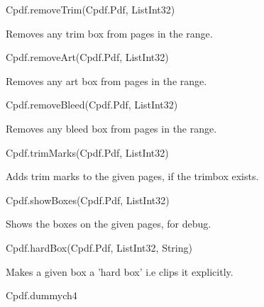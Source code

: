 Cpdf.removeTrim(Cpdf.Pdf, List{Int32})

Removes any trim box from pages in the range.

Cpdf.removeArt(Cpdf.Pdf, List{Int32})

Removes any art box from pages in the range.

Cpdf.removeBleed(Cpdf.Pdf, List{Int32})

Removes any bleed box from pages in the range.

Cpdf.trimMarks(Cpdf.Pdf, List{Int32})

Adds trim marks to the given pages, if the
trimbox exists.

Cpdf.showBoxes(Cpdf.Pdf, List{Int32})

Shows the boxes on the given pages, for debug.

Cpdf.hardBox(Cpdf.Pdf, List{Int32}, String)

Makes a given box a 'hard box' i.e clips it explicitly.

Cpdf.dummych4

